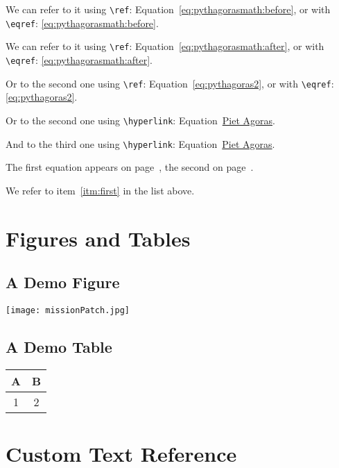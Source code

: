 \documentclass{ximera}
\begin{document}
We can refer to it using \verb|\ref|: Equation~\ref{eq:pythagorasmath:before}, or with \verb|\eqref|: \eqref{eq:pythagorasmath:before}.

We can refer to it using \verb|\ref|: Equation~\ref{eq:pythagorasmath:after}, or with \verb|\eqref|: \eqref{eq:pythagorasmath:after}.

Or to the second one using \verb|\ref|: Equation~\ref{eq:pythagoras2}, or with \verb|\eqref|: \eqref{eq:pythagoras2}.

Or to the second one using \verb|\hyperlink|: Equation~\hyperlink{eq:pythagoras:before}{Piet Agoras}.

And to the third one using \verb|\hyperlink|: Equation~\hyperlink{eq:pythagoras:after}{Piet Agoras}.


The first equation appears on page~\pageref{eq:pythagoras}, the second on page~\pageref{eq:pythagoras2}.

We refer to item~\ref{itm:first} in the list above.

\section{Figures and Tables}

\subsection{A Demo Figure}
\label{sec:fig}

\begin{image}[0.3\textwidth]
  \centering
  \texttt{[image: missionPatch.jpg]} %
\end{image}
  \label{fig:demo}

\subsection{A Demo Table}

{
  \centering
  \begin{tabular}{|c|c|}
    \hline
    A & B \\
    \hline
    1 & 2 \\
    \hline
  \end{tabular}
  \label{tab:example}
}

\section{Custom Text Reference}
\end{document}
